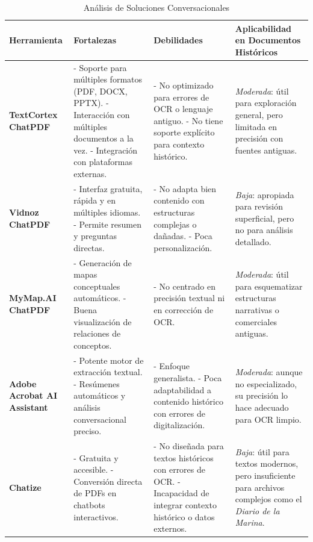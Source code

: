 \begin{longtable}{p{3.2cm} p{4.5cm} p{4.5cm} p{3.5cm}}
	\caption{Análisis de Soluciones Conversacionales} \label{tab:Análisis de Soluciones Conversacionales} \\ 
	\toprule
	\textbf{Herramienta} & \textbf{Fortalezas} & \textbf{Debilidades} & \textbf{Aplicabilidad en Documentos Históricos} \\
	\midrule
	\textbf{TextCortex ChatPDF} &
	- Soporte para múltiples formatos (PDF, DOCX, PPTX). \newline
	- Interacción con múltiples documentos a la vez. \newline
	- Integración con plataformas externas. &
	- No optimizado para errores de OCR o lenguaje antiguo. \newline
	- No tiene soporte explícito para contexto histórico. &
	\textit{Moderada}: útil para exploración general, pero limitada en precisión con fuentes antiguas. \\
	\midrule
	\textbf{Vidnoz ChatPDF} &
	- Interfaz gratuita, rápida y en múltiples idiomas. \newline
	- Permite resumen y preguntas directas. &
	- No adapta bien contenido con estructuras complejas o dañadas. \newline
	- Poca personalización. &
	\textit{Baja}: apropiada para revisión superficial, pero no para análisis detallado. \\
	\midrule
	\textbf{MyMap.AI ChatPDF} &
	- Generación de mapas conceptuales automáticos. \newline
	- Buena visualización de relaciones de conceptos. &
	- No centrado en precisión textual ni en corrección de OCR. &
	\textit{Moderada}: útil para esquematizar estructuras narrativas o comerciales antiguas. \\
	\midrule
	\textbf{Adobe Acrobat AI Assistant} &
	- Potente motor de extracción textual. \newline
	- Resúmenes automáticos y análisis conversacional preciso. &
	- Enfoque generalista. \newline
	- Poca adaptabilidad a contenido histórico con errores de digitalización. &
	\textit{Moderada}: aunque no especializado, su precisión lo hace adecuado para OCR limpio. \\
	\midrule
	\textbf{Chatize} &
	- Gratuita y accesible. \newline
	- Conversión directa de PDFs en chatbots interactivos. &
	- No diseñada para textos históricos con errores de OCR. \newline
	- Incapacidad de integrar contexto histórico o datos externos. &
	\textit{Baja}: útil para textos modernos, pero insuficiente para archivos complejos como el \textit{Diario de la Marina}. \\
	\bottomrule
\end{longtable}

